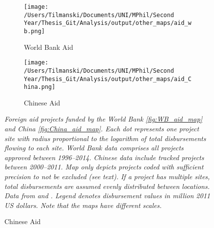 \documentclass[11pt, oneside]{article}   	%
\newcommand{\mysubcaption}[1]{
\justify
\begin{spacing}{0.7}
\textit{\footnotesize #1}
\end{spacing}}
\begin{document}
\begin{figure}[t]
\centering
\caption{Spatial Distribution of Development Aid Projects to African Nations}

\begin{subfigure}[c]{0.48\textwidth}
\texttt{[image: /Users/Tilmanski/Documents/UNI/MPhil/Second Year/Thesis\_Git/Analysis/output/other\_maps/aid\_wb.png]}
\caption{World Bank Aid}
\label{fig:WB_aid_map}
\end{subfigure}
\begin{subfigure}[c]{0.48\textwidth}
\texttt{[image: /Users/Tilmanski/Documents/UNI/MPhil/Second Year/Thesis\_Git/Analysis/output/other\_maps/aid\_China.png]}
\caption{Chinese Aid}
\label{fig:China_aid_map}
\end{subfigure}

\label{fig:Aid_maps}
\mysubcaption{Foreign aid projects funded by the World Bank \eqref{fig:WB_aid_map} and China \eqref{fig:China_aid_map}. Each dot represents one project site with radius proportional to the logarithm of total disbursements flowing to each site. World Bank data comprises all projects approved between 1996--2014. Chinese data include tracked projects between 2000--2011. Map only depicts projects coded with sufficient precision to not be excluded (see text). If a project has multiple sites, total disbursements are assumed evenly distributed between locations. Data from \cite{AidData_WorldBankGeocoded_2017} and \cite{Strange_TrackingUnderreportedFinancial_2017}. Legend denotes disbursement values in million 2011 US dollars. Note that the maps have different scales.}
\end{figure}
\end{document}
